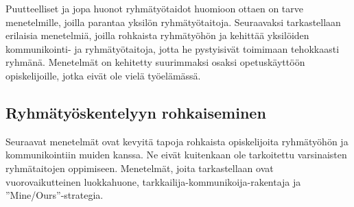 \documentclass[finnish]{../tktltiki2}
\theoremstyle{definition}
\theoremstyle{remark}
\begin{document}

Puutteelliset ja jopa huonot ryhmätyötaidot huomioon ottaen on tarve menetelmille, joilla parantaa yksilön ryhmätyötaitoja.
Seuraavaksi tarkastellaan erilaisia menetelmiä, joilla
rohkaista ryhmätyöhön ja kehittää yksilöiden kommunikointi- ja ryhmätyötaitoja, jotta he pystyisivät toimimaan tehokkaasti ryhmänä. Menetelmät on
kehitetty suurimmaksi osaksi opetuskäyttöön opiskelijoille,
jotka eivät ole vielä työelämässä.

\subsection{Ryhmätyöskentelyyn rohkaiseminen}

\enlargethispage{\baselineskip}

Seuraavat menetelmät ovat kevyitä tapoja rohkaista opiskelijoita
ryhmätyö\-hön ja kommunikointiin muiden kanssa. Ne eivät kuitenkaan
ole tarkoitettu varsinaisten ryhmätaitojen oppimiseen. Menetelmät, joita tarkastellaan
ovat vuorovaikutteinen luokkahuone, tarkkailija-kommunikoija-rakentaja ja ''Mine/Ours''-strategia.
\end{document}
